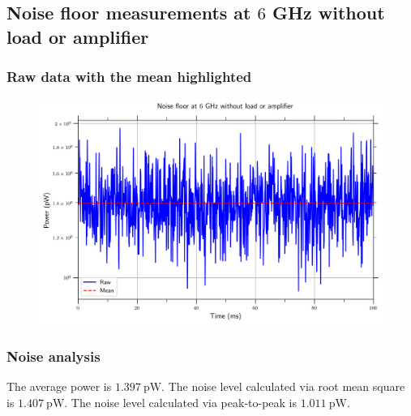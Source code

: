 \documentclass[english,12pt,a4paper]{article}
\begin{document}
 

\hypertarget{noise-floor-measurements-at-6-ghz-without-load-or-amplifier}{%
	\subsection{\texorpdfstring{Noise floor measurements at \(6\) GHz without
			load or
			amplifier}{Noise floor measurements at 6 GHz without load or amplifier}}\label{noise-floor-measurements-at-6-ghz-without-load-or-amplifier}}

 

\hypertarget{raw-data-with-the-mean-highlighted}{%
	\subsubsection{Raw data with the mean
		highlighted}\label{raw-data-with-the-mean-highlighted_1}}

\begin{figure}[H]
	\includegraphics[width=1\linewidth]{Plots/noise_floor_6_GHz}
	\caption[Noise floor at 6 GHz]{}
	\label{fig:noisefloor6ghz}
\end{figure}



\hypertarget{noise-analysis}{%
	\subsubsection{Noise analysis}\label{noise-analysis_1}}


	The average power is $\qty{1.397}{\pico\watt}$.
	The noise level calculated via root mean square is $\qty{1.407}{\pico\watt}$.
	The noise level calculated via peak-to-peak is $\qty{1.011}{\pico\watt}$.
	
\end{document}
